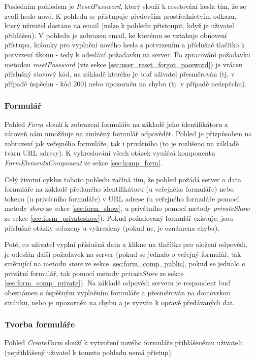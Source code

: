 		Posledním pohledem je \textit{ResetPassword}, který slouží k resetování hesla tím, že se zvolí heslo nové. K pohledu se přistupuje především prostřednictvím odkazu, který uživatel dostane na email (nelze k pohledu přistoupit, když je uživatel přihlášen). V pohledu je zobrazen email, ke kterému se vztahuje obnovení přístupu, kolonky pro vyplnění nového hesla s potvrzením a příslušné tlačítko k potvrzení úkonu - tedy k odeslání požadavku na server. Po zpracování požadavku metodou \textit{resetPassword} (viz sekce \ref{sec:user_reset_forgot_password}) je vrácen příslušný stavový kód, na základě kterého je buď uživatel přesměrován (tj. v případě úspěchu - kód 200) nebo upozorněn na chybu (tj. v případě neúspěchu).
		
		\subsubsection{Formulář} %
		Pohled \textit{Form} slouží k zobrazení formuláře na základě jeho identifikátoru a zároveň nám umožňuje na zmíněný formulář odpovědět. Pohled je přizpůsoben na zobrazení jak veřejného formuláře, tak i privátního (to je rozlišeno na základě tvaru URL adresy). K vykreslování všech otázek využívá komponentu \textit{FormElementsComponent} ze sekce \ref{sec:komp_form}.
		
		Celý životní cyklus tohoto pohledu začíná tím, že pohled požádá server o data formuláře na základě předaného identifikátoru (u veřejného formuláře) nebo tokenu (u privátního formuláře) v URL adrese (u veřejného formuláře pomocí metody \textit{show} ze sekce \ref{sec:form_show}, u privátního pomocí metody \textit{privateShow} ze sekce \ref{sec:form_privateshow}). Pokud požadovaný formulář existuje, jsou příslušné otázky seřazeny a vykresleny (pokud ne, je oznámena chyba).
		
		Poté, co uživatel vyplní příslušná data a klikne na tlačítko pro uložení odpovědi, je odeslán další požadavek na server (pokud se jednalo o veřejný formulář, tak směrující na metodu \textit{store} ze sekce \ref{sec:form_comp_public}, pokud se jednalo o privátní formulář, tak pomocí metody \textit{privateStore} ze sekce \ref{sec:form_comp_private}). Na základě odpovědi serveru je respondent buď obeznámen s úspěšným vyplněním formuláře a přesměrován na domovskou stránku, nebo je upozorněn na chybu a je vyzván k opravě předávaných dat.
		
		\subsubsection{Tvorba formuláře}\label{sec:pohled_tvorba_formulare} %
		Pohled \textit{CreateForm} slouží k vytvoření nového formuláře přihlášenému uživateli (nepřihlášený uživatel k tomuto pohledu nemá přístup). 
		
